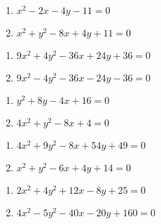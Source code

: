 \begin{multicols}{2}
\begin{enumerate}
\setcounter{enumi}{\value{HW}}

\item $x^2-2x-4y-11=0$  \label{generalconicfirst}
\item $x^2 + y^2-8x+4y+11=0$

\setcounter{HW}{\value{enumi}}
\end{enumerate}
\end{multicols}

\begin{multicols}{2}
\begin{enumerate}
\setcounter{enumi}{\value{HW}}

\item  $9x^2 + 4y^2-36x+24y + 36=0$

\item $9x^2-4y^2-36x-24y-36=0$


\setcounter{HW}{\value{enumi}}
\end{enumerate}
\end{multicols}


\begin{multicols}{2}
\begin{enumerate}
\setcounter{enumi}{\value{HW}}

\item  $y^2+8y-4x+16=0$

\item  $4x^2+y^2-8x+4=0$


\setcounter{HW}{\value{enumi}}
\end{enumerate}
\end{multicols}


\begin{multicols}{2}
\begin{enumerate}
\setcounter{enumi}{\value{HW}}

\item   $4x^2+9y^2-8x+54y+49=0$

\item  $x^2 + y^2-6x+4y+14=0$

\setcounter{HW}{\value{enumi}}
\end{enumerate}
\end{multicols}


\begin{multicols}{2}
\begin{enumerate}
\setcounter{enumi}{\value{HW}}

\item  $2x^2+ 4y^2+12x-8y+25=0$

\item   $4x^2-5y^2-40x-20y+160=0$  \label{generalconiclast}


\setcounter{HW}{\value{enumi}}
\end{enumerate}
\end{multicols}




